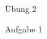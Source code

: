 \begin{section}{Übung 2}
\begin{subsection}{Aufgabe 1}
\begin{enumerate}
  \end{enumerate}

 \end{subsection}

\end{section}
